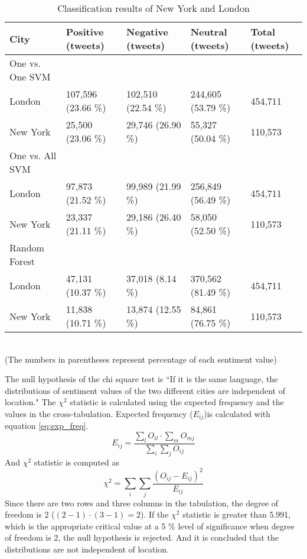 \begin{table}[ht]
	\caption{Classification results of New York and London}
	\begin{tabular}{|l|p{1.8cm}|p{1.8cm}|p{1.8cm}|p{1.8cm}|} \hline
	City&Positive (tweets)&Negative (tweets)&Neutral (tweets)&Total (tweets)\\ \hline
	One vs. One SVM & {} & {} & {} & {}\\ \hline
London & 107,596 (23.66 \%) & 102,510 (22.54 \%) & 244,605 (53.79 \%)& 454,711 \\ \hline
New York & 25,500 (23.06 \%) & 29,746 (26.90 \%)& 55,327 (50.04 \%)& 110,573 \\ \hline
	One vs. All SVM & {} & {} & {} & {}\\ \hline

London & 97,873 (21.52 \%) & 99,989 (21.99 \%) & 256,849 (56.49 \%)& 454,711 \\ \hline

New York & 23,337 (21.11 \%)& 29,186 (26.40 \%)& 58,050 (52.50 \%)& 110,573 \\ \hline
	Random Forest & {} & {} & {} & {}\\ \hline

London & 47,131 (10.37 \%)  & 37,018 (8.14 \%)  & 370,562 (81.49 \%) & 454,711 \\ \hline

New York  & 11,838 (10.71 \%)& 13,874 (12.55 \%)& 84,861 (76.75 \%)& 110,573 \\ \hline
	\end{tabular}
	\label{tab:result_london_ny}
	\\(The numbers in parentheses represent percentage of each sentiment value)
\end{table}

The null hypothesis of the chi square test is ``If it is the same language, the distributions of sentiment values of the two different cities are independent of location."
The $\chi^2$ statistic is calculated using the expected frequency and the values in the cross-tabulation.
Expected frequency ($E_{ij}$)is calculated with equation \ref{eq:exp_freq}.
\begin{equation}
E_{ij} = \frac{\sum_{l} O_{il} \cdot \sum_{m} O_{mj}}{\sum_{i} \sum_{j} O_{ij}}
\label{eq:exp_freq}
\end{equation}
And $\chi^2$ statistic is computed as 
\begin{equation}
\chi^2 = \sum_{i} \sum_{j} \frac{(O_{ij} - E_{ij})^2}{E_{ij}}
\end{equation}
Since there are two rows and three columns in the tabulation, the degree of freedom is 2 ($(2 - 1 ) \cdot  (3 - 1) = 2$).
If the $\chi^2$ statistic is greater than 5.991, which is the appropriate critical value at a 5 \% level of significance when degree of freedom is 2, the null hypothesis is rejected.
And it is concluded that the distributions are not independent of location. 

